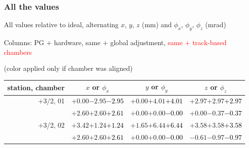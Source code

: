 \documentclass[compress]{beamer}
\begin{document}
\begin{frame}
\frametitle{All the values}
\tiny

All values relative to ideal, alternating $x$, $y$, $z$ (mm) and $\phi_x$, $\phi_y$, $\phi_z$ (mrad)

Columns: PG $+$ hardware, same $+$ global adjustment, \textcolor{red}{same $+$ track-based chambers}

\hfill (color applied only if chamber was aligned)

\vfill
\renewcommand{\arraystretch}{1.1}
\begin{tabular}{r | c | c | c}
station, chamber & $x$ or $\phi_x$ & $y$ or $\phi_y$ & $z$ or $\phi_z$ \\\hline
$+$3/2, 01 & $+0.00$\hspace{0.1 cm}$-2.95$\hspace{0.1 cm}\textcolor{black}{$-2.95$} & $+0.00$\hspace{0.1 cm}$+4.01$\hspace{0.1 cm}\textcolor{black}{$+4.01$} & $+2.97$\hspace{0.1 cm}$+2.97$\hspace{0.1 cm}\textcolor{black}{$+2.97$} \\
           & $+2.60$\hspace{0.1 cm}$+2.60$\hspace{0.1 cm}\textcolor{black}{$+2.61$} & $+0.00$\hspace{0.1 cm}$+0.00$\hspace{0.1 cm}\textcolor{black}{$-0.00$} & $+0.00$\hspace{0.1 cm}$-0.37$\hspace{0.1 cm}\textcolor{black}{$-0.37$} \\
$+$3/2, 02 & $+3.42$\hspace{0.1 cm}$+1.24$\hspace{0.1 cm}\textcolor{black}{$+1.24$} & $+1.65$\hspace{0.1 cm}$+6.44$\hspace{0.1 cm}\textcolor{black}{$+6.44$} & $+3.58$\hspace{0.1 cm}$+3.58$\hspace{0.1 cm}\textcolor{black}{$+3.58$} \\
           & $+2.60$\hspace{0.1 cm}$+2.60$\hspace{0.1 cm}\textcolor{black}{$+2.61$} & $+0.00$\hspace{0.1 cm}$+0.00$\hspace{0.1 cm}\textcolor{black}{$-0.00$} & $-0.61$\hspace{0.1 cm}$-0.97$\hspace{0.1 cm}\textcolor{black}{$-0.97$} \\

\end{tabular}
\end{frame}
\end{document}
